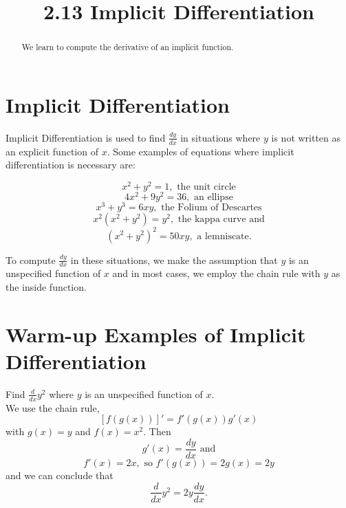 \documentclass{ximera}
\title{2.13 Implicit Differentiation}
\begin{document}
\begin{abstract}
We learn to compute the derivative of an implicit function.
\end{abstract}

\maketitle

\section{Implicit Differentiation}

Implicit Differentiation is used to find $\frac{dy}{dx}$ in situations where $y$ is not written 
as an explicit function of $x$. 
Some examples of equations where implicit differentiation is necessary are:

\[x^2 + y^2 = 1, \text{ the unit circle} \]
\[4x^2 + 9y^2 = 36, \text{ an ellipse} \]
\[x^3 + y^3 =6xy, \text{ the Folium of Descartes}\]
\[x^2(x^2 + y^2) =y^2,  \text{ the kappa curve and}\]
\[(x^2 + y^2)^2 =50xy, \text{ a lemniscate}.\]

To compute $\frac{dy}{dx}$ in these situations, we make the assumption that $y$ is an unspecified 
function of $x$ and in most cases,
we employ the chain rule  with $y$ as the inside function.

\section{Warm-up Examples of Implicit Differentiation}

\begin{example} %
Find $\frac{d}{dx} y^2$ where $y$ is an unspecified function of $x$.\\
We use the chain rule,
\[\displaystyle{[f(g(x))]' = f'(g(x))g'(x)}\]
with $g(x) = y$ and $f(x) = x^2$. Then 
\[g'(x) = \frac{dy}{dx} \text{ and}\]
\[f'(x) = 2x, \text{ so } f'(g(x)) = 2g(x) = 2y\]
and we can conclude that
\[\frac{d}{dx} y^2 = 2y \frac{dy}{dx}.\]
\end{example}


\begin{center}
\begin{foldable}
\end{foldable}
\end{center}
\end{document}
